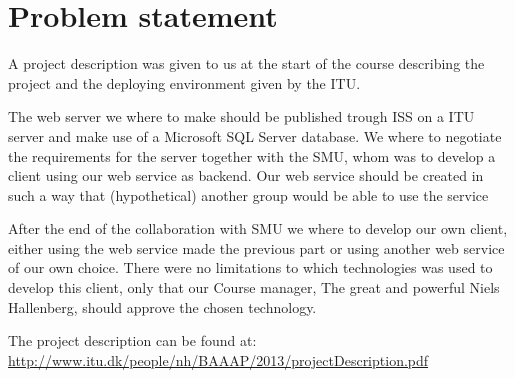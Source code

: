 \section{Problem statement}
A project description was given to us at the start of the course describing the project and the deploying environment given by the ITU.

The web server we where to make should be published trough ISS on a ITU server and make use of a Microsoft SQL Server database.
We where to negotiate the requirements for the server together with the SMU, whom was to develop a client using our web service as backend.
Our web service should be created in such a way that (hypothetical) another group would be able to use the service

After the end of the collaboration with SMU we where to develop our own client, either using the web service made the previous part or using another web service of our own choice.
There were no limitations to which technologies was used to develop this client, only that our Course manager, The great and powerful Niels Hallenberg, should approve the chosen technology.

The project description can be found at: \url{http://www.itu.dk/people/nh/BAAAP/2013/projectDescription.pdf}
\newpage